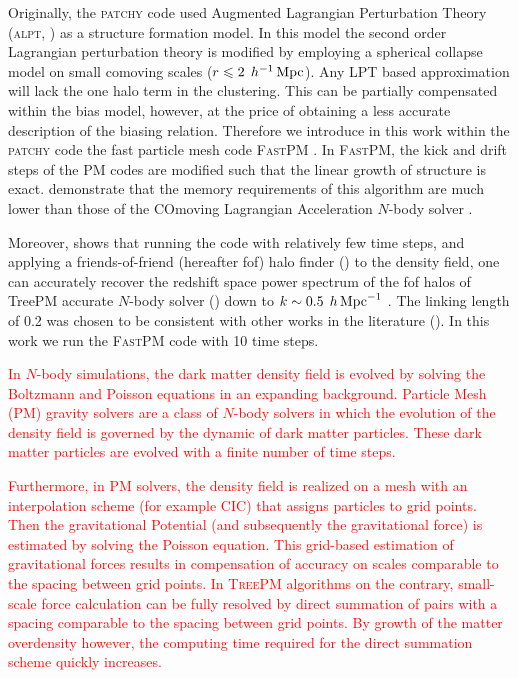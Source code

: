 \documentclass[english,usenatbib]{mn2e}
\newcommand{\tod}[1]{{\textcolor{red}{ #1}}}
\newcommand{\mperh}{\,h^{-1}\,{\rm Mpc}}
\newcommand{\hperm}{\,h\,{\rm Mpc}^{-1}}
\begin{document}
Originally, the \textsc{patchy} code used Augmented Lagrangian Perturbation Theory (\textsc{alpt}, \citealt{alpt}) as a structure formation model. In this model the second order Lagrangian perturbation theory is modified by employing a spherical collapse model on small comoving scales ($r\leq 2\;\mperh$). 
Any LPT based approximation will lack the one halo term in the clustering. This can be partially compensated within the bias model, however, at the price of obtaining a less accurate description of the biasing relation.
Therefore we introduce in this work within the \textsc{patchy} code the fast particle mesh code \textsc{FastPM} \citep{fastpm}. 
In \textsc{FastPM}, the kick and drift steps of the PM codes are modified such that the linear growth of structure is exact. \citet{fastpm} demonstrate that the memory requirements of this algorithm are much lower than those of the COmoving Lagrangian Acceleration $N$-body solver \citep[\textsc{cola},][]{cola2013}. 

Moreover, \citet{fastpm} shows that running the code with relatively few time steps, and applying a friends-of-friend (hereafter fof) halo finder (\citealt{fof}) to the density field, one can accurately recover the redshift space power spectrum of the fof halos of TreePM accurate $N$-body solver (\citealt{treepm}) down to $k \sim 0.5 \; \hperm$ . The linking length of 0.2 was chosen to be consistent with other works in the literature (\citealt{cola2013}). In this work we run the \textsc{FastPM} code with 10 time steps. 

\tod{In $N$-body simulations, the dark matter density field
is evolved by solving the Boltzmann and Poisson equations
in an expanding background. Particle Mesh (PM) gravity
solvers are a class of $N$-body solvers in which the evolution
of the density field is governed by the dynamic of
dark matter particles. These dark matter particles are
evolved with a finite number of time steps.}

\tod{Furthermore, in PM solvers, the density field is realized on a mesh
with an interpolation scheme (for example CIC) that assigns
particles to grid points. Then the gravitational Potential
(and subsequently the gravitational force) is estimated
by solving the Poisson equation. This grid-based
estimation of gravitational forces results in compensation
of accuracy on scales comparable to the spacing
between grid points. In \textsc{TreePM} algorithms on the contrary, small-scale
force calculation can be fully resolved by direct summation
of pairs with a spacing comparable to the spacing between
grid points. By growth of the matter overdensity
however, the computing time required for the direct summation
scheme quickly increases.} 
\end{document}
